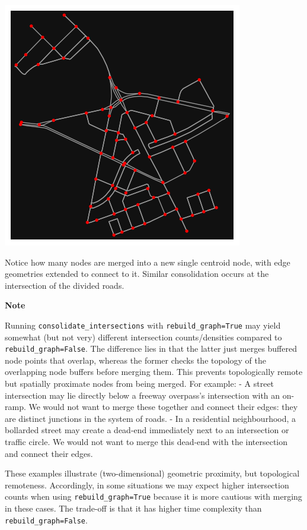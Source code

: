 \documentclass[
  letterpaper,
  DIV=11,
  numbers=noendperiod]{scrreprt}
\begin{document}
\includegraphics{labs/w07_OSM_files/figure-pdf/cell-20-output-1.png}

Notice how many nodes are merged into a new single centroid node, with
edge geometries extended to connect to it. Similar consolidation occurs
at the intersection of the divided roads.

\textbf{Note}

Running \texttt{consolidate\_intersections} with
\texttt{rebuild\_graph=True} may yield somewhat (but not very) different
intersection counts/densities compared to \texttt{rebuild\_graph=False}.
The difference lies in that the latter just merges buffered node points
that overlap, whereas the former checks the topology of the overlapping
node buffers before merging them. This prevents topologically remote but
spatially proximate nodes from being merged. For example: - A street
intersection may lie directly below a freeway overpass's intersection
with an on-ramp. We would not want to merge these together and connect
their edges: they are distinct junctions in the system of roads. - In a
residential neighbourhood, a bollarded street may create a dead-end
immediately next to an intersection or traffic circle. We would not want
to merge this dead-end with the intersection and connect their edges.

These examples illustrate (two-dimensional) geometric proximity, but
topological remoteness. Accordingly, in some situations we may expect
higher intersection counts when using \texttt{rebuild\_graph=True}
because it is more cautious with merging in these cases. The trade-off
is that it has higher time complexity than
\texttt{rebuild\_graph=False}.
\end{document}
